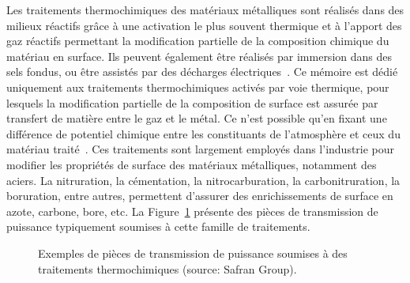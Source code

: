 Les traitements thermochimiques des matériaux métalliques sont réalisés dans des milieux réactifs grâce à une activation le plus souvent thermique et à l'apport des gaz réactifs permettant la modification partielle de la composition chimique du matériau en surface. Ils peuvent également être réalisés par immersion dans des sels fondus, ou être assistés par des décharges électriques~\cite{Chiaverini1988,Steel2006}. Ce mémoire est dédié uniquement aux traitements thermochimiques activés par voie thermique, pour lesquels la modification partielle de la composition de surface est assurée par transfert de matière entre le gaz et le métal. Ce n'est possible qu'en fixant une différence de potentiel chimique entre les constituants de l'atmosphère et ceux du matériau traité~\cite{Slycke1981i,Steel2006}. Ces traitements sont largement employés dans l'industrie pour modifier les propriétés de surface des matériaux métalliques, notamment des aciers. La nitruration, la cémentation, la nitrocarburation, la carbonitruration, la boruration, entre autres, permettent d'assurer des enrichissements de surface en azote, carbone, bore, etc. La Figure~\ref{fig:exemples-pieces} présente des pièces de transmission de puissance typiquement soumises à cette famille de traitements. 

\begin{figure}[!hb]
  \centering
  
  \caption{\label{fig:exemples-pieces}Exemples de pièces de transmission de puissance soumises à des traitements thermochimiques (source: Safran Group).}
\end{figure}

